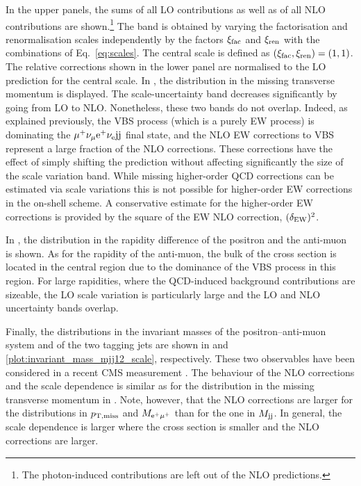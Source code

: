 \documentclass[a4article,11pt]{article}
\begin{document}
%
In the upper panels, the sums of all LO contributions as well as of all
NLO contributions are shown.\footnote{The photon-induced contributions
  are left out of the NLO predictions.}  The band is obtained by
varying the 
factorisation and renormalisation scales independently by the factors
$\xi_{\rm fac}$ and $\xi_{\rm ren}$ with the combinations of
Eq.~\eqref{eq:scales}. The central scale is defined as $(\xi_{\rm fac},\xi_{\rm ren}) =
\left(1,1\right)$.  The relative
corrections shown in the lower panel are normalised to the LO prediction for the
central scale.  In
, the distribution
in the missing transverse momentum is displayed.  The
scale-uncertainty band  decreases significantly by going from LO to NLO.
Nonetheless, these two bands do not overlap.  Indeed, as
explained previously, the VBS process (which is a purely EW process) is
dominating the $\mu^+\nu_\mu\text{e}^+\nu_{\text{e}}\text{j}\text{j}$ final state, and the NLO EW corrections to VBS
represent a large fraction of the NLO corrections.  These corrections have the
effect of simply shifting the prediction without affecting
significantly the size of the scale variation band.  
While missing higher-order QCD corrections can be estimated via
scale variations this is not possible for higher-order EW corrections
in the on-shell scheme. A conservative estimate for the
higher-order EW corrections is provided by the square of the EW NLO
correction, $(\delta_{\rm EW})^2$.

In , the distribution in
the rapidity difference of the positron and the anti-muon is shown.
As for the rapidity of the anti-muon, the bulk of the cross section is
located in the central region due to the dominance of the VBS process
in this region.  For large rapidities, where the QCD-induced background
contributions are sizeable, the LO scale variation is
particularly large and the LO and NLO uncertainty bands overlap.

Finally, the distributions in the invariant masses of the
positron--anti-muon system and of the two tagging jets are shown in
 and
\ref{plot:invariant_mass_mjj12_scale}, respectively.
These two observables have been considered 
in {a} recent CMS measurement
\cite{CMS:2017adb}. The behaviour of the NLO corrections and the scale
dependence is similar as for the distribution in the missing
transverse momentum in
.
Note, however, that the NLO corrections are larger for the
distributions in $p_{\rm T,miss}$ and $M_{\text{e}^+\mu^+}$ than for the
one in  $M_{\text{j}\text{j}}$.
In general, the scale dependence is larger where the cross section is
smaller and the NLO corrections are larger.
\end{document}
